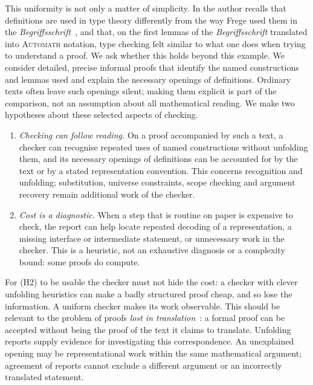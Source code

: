 \documentclass[11pt]{article}
\begin{document}
This uniformity is not only a matter of simplicity. In \cite{Rem} the
author recalls that definitions are used in type theory differently from
the way Frege used them in the \emph{Begriffsschrift}~\cite{Frege}, and
that, on the first lemmas of the \emph{Begriffsschrift} translated into
\textsc{Automath} notation, type checking felt similar to what one does
when trying to understand a proof. We ask whether this holds beyond this
example. We consider detailed, precise informal
proofs that identify the named constructions and lemmas used and explain
the necessary openings of definitions. Ordinary texts often leave such
openings silent; making them explicit is part of the comparison, not an
assumption about all mathematical reading. We make two hypotheses about
these selected aspects of checking.
\begin{enumerate}
\item[(H1)] \emph{Checking can follow reading.} On a proof accompanied
  by such a text, a checker can recognise repeated uses of named
  constructions without unfolding them, and its necessary openings of
  definitions can be accounted for by the text or by a stated
  representation convention. This concerns recognition and unfolding;
  substitution, universe constraints, scope checking and argument
  recovery remain additional work of the checker.
\item[(H2)] \emph{Cost is a diagnostic.} When a step that is routine on
  paper is expensive to check, the report can help locate repeated
  decoding of a representation, a missing interface or intermediate
  statement, or unnecessary work in the checker. This is a heuristic,
  not an exhaustive diagnosis or a complexity bound: some proofs do
  compute.
\end{enumerate}
For (H2) to be usable the checker must not hide the cost: a checker with
clever unfolding heuristics can make a badly structured proof cheap, and
so lose the information. A uniform checker makes its work observable.
This should be relevant to the problem of proofs \emph{lost in
translation}~\cite{BCH}: a formal proof can be accepted without being the
proof of the text it claims to translate. Unfolding reports supply
evidence for investigating this correspondence. An unexplained opening
may be representational work within the same mathematical argument;
agreement of reports cannot exclude a different argument or an
incorrectly translated statement.
\end{document}
